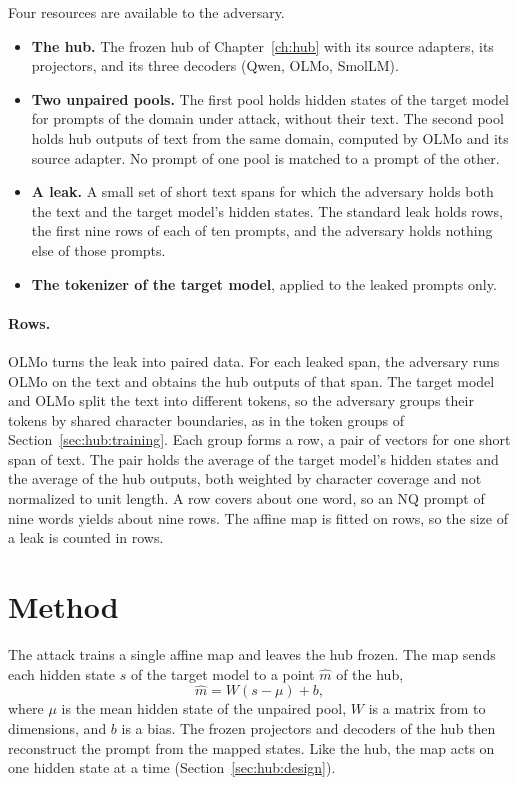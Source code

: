 Four resources are available to the adversary.
\begin{itemize}
\item \textbf{The hub.} The frozen hub of Chapter~\ref{ch:hub} with its source adapters, its projectors, and its three decoders (Qwen, OLMo, SmolLM).
\item \textbf{Two unpaired pools.} The first pool holds hidden states of the target model for prompts of the domain under attack, without their text.
The second pool holds hub outputs of text from the same domain, computed by OLMo and its source adapter.
No prompt of one pool is matched to a prompt of the other.
\item \textbf{A leak.} A small set of short text spans for which the adversary holds both the text and the target model's hidden states.
The standard leak holds  rows, the first nine rows of each of ten prompts, and the adversary holds nothing else of those prompts.
\item \textbf{The tokenizer of the target model}, applied to the leaked prompts only.
\end{itemize}

\paragraph{Rows.} OLMo turns the leak into paired data.
For each leaked span, the adversary runs OLMo on the text and obtains the hub outputs of that span. %
The target model and OLMo split the text into different tokens, so the adversary groups their tokens by shared character boundaries, as in the token groups of Section~\ref{sec:hub:training}.
Each group forms a row, a pair of vectors for one short span of text.
The pair holds the average of the target model's hidden states and the average of the hub outputs, both weighted by character coverage and not normalized to unit length. %
A row covers about one word, so an NQ prompt of nine words yields about nine rows. %
The affine map is fitted on rows, so the size of a leak is counted in rows.

\section{Method}\label{sec:attack:method}

The attack trains a single affine map and leaves the hub frozen.
The map sends each hidden state $s$ of the target model to a point $\hat m$ of the hub,
\begin{equation}
\hat m = W(s - \mu) + b ,
\label{eq:attack:map}
\end{equation}
where $\mu$ is the mean hidden state of the unpaired pool, $W$ is a matrix from  to  dimensions, and $b$ is a bias. %
The frozen projectors and decoders of the hub then reconstruct the prompt from the mapped states.
Like the hub, the map acts on one hidden state at a time (Section~\ref{sec:hub:design}).

